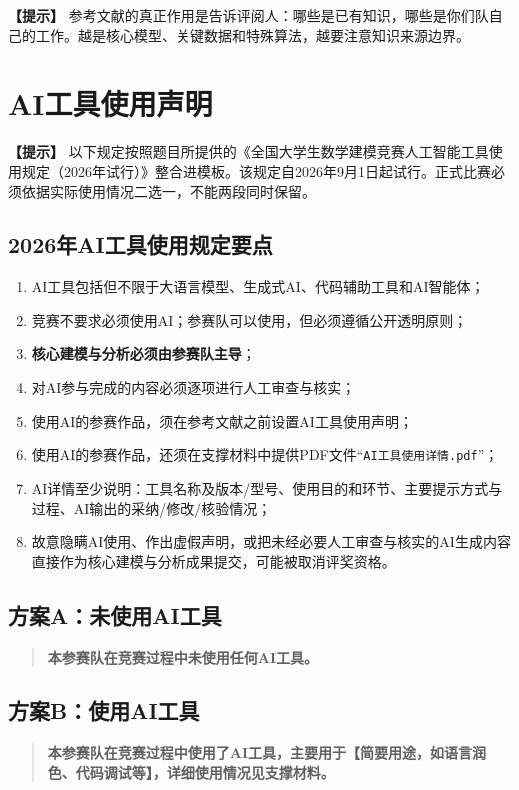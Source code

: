 \documentclass[12pt,a4paper]{article}
\newcommand{\tip}[1]{\par\noindent\textbf{【提示】} #1\par}
\begin{document}
\tip{参考文献的真正作用是告诉评阅人：哪些是已有知识，哪些是你们队自己的工作。越是核心模型、关键数据和特殊算法，越要注意知识来源边界。}

\section*{AI工具使用声明}

\tip{以下规定按照题目所提供的《全国大学生数学建模竞赛人工智能工具使用规定（2026年试行）》整合进模板。该规定自2026年9月1日起试行。正式比赛必须依据实际使用情况二选一，不能两段同时保留。}

\subsection*{2026年AI工具使用规定要点}
\begin{enumerate}
  \item AI工具包括但不限于大语言模型、生成式AI、代码辅助工具和AI智能体；
  \item 竞赛不要求必须使用AI；参赛队可以使用，但必须遵循公开透明原则；
  \item \textbf{核心建模与分析必须由参赛队主导}；
  \item 对AI参与完成的内容必须逐项进行人工审查与核实；
  \item 使用AI的参赛作品，须在参考文献之前设置AI工具使用声明；
  \item 使用AI的参赛作品，还须在支撑材料中提供PDF文件“\texttt{AI工具使用详情.pdf}”；
  \item AI详情至少说明：工具名称及版本/型号、使用目的和环节、主要提示方式与过程、AI输出的采纳/修改/核验情况；
  \item 故意隐瞒AI使用、作出虚假声明，或把未经必要人工审查与核实的AI生成内容直接作为核心建模与分析成果提交，可能被取消评奖资格。
\end{enumerate}

\subsection*{方案A：未使用AI工具}
\begin{quote}
\textbf{本参赛队在竞赛过程中未使用任何AI工具。}
\end{quote}

\subsection*{方案B：使用AI工具}
\begin{quote}
\textbf{本参赛队在竞赛过程中使用了AI工具，主要用于【简要用途，如语言润色、代码调试等】，详细使用情况见支撑材料。}
\end{quote}
\end{document}
